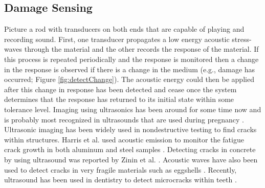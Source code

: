 \subsection{Damage Sensing}

Picture a rod with transducers on both ends that are capable of playing and recording sound. First, one transducer propagates a low energy acoustic stress-waves through the material and the other records the response of the material. If this process is repeated periodically and the response is monitored then a change in the response is observed if there is a change in the medium (e.g., damage has occurred; Figure \ref{fig:detectChange}). The acoustic energy could then be applied after this change in response has been detected and cease once the system determines that the response has returned to its initial state within some tolerance level. Imaging using ultrasonics has been around for some time now and is probably most recognized in ultrasounds that are used during pregnancy \cite{Ultrasound2006}. Ultrasonic imaging has been widely used in nondestructive testing to find cracks within structures. Harris et al. used acoustic emission to monitor the fatigue crack growth in both aluminum and steel samples \cite{Harris1974}. Detecting cracks in concrete by using ultrasound was reported by Zinin et al. \cite{Zinin2000}. Acoustic waves have also been used to detect cracks in very fragile materials such as eggshells \cite{DeKetelaere2000}. Recently, ultrasound has been used in dentistry to detect microcracks within teeth \cite{Matsushita2012}.


